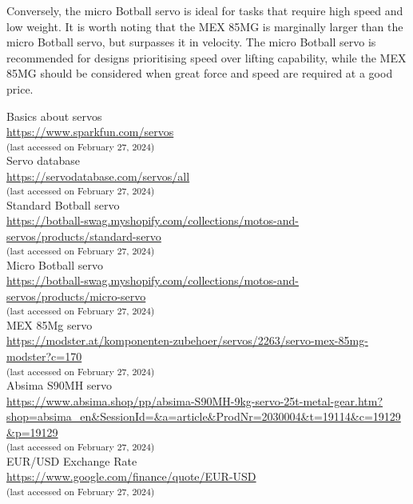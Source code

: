 \documentclass[conference]{IEEEtran}
\begin{document}
    Conversely, the micro Botball servo is ideal for tasks that require high speed and low weight. It is worth noting that the MEX 85MG is marginally larger than the micro Botball servo, but surpasses it in velocity.  The micro Botball servo is recommended for designs prioritising speed over lifting capability, while the MEX 85MG should be considered when great force and speed are required at a good price.

\begin{thebibliography}{00}
     Basics about servos\\
    \url{https://www.sparkfun.com/servos}\\
    \textsubscript{(last accessed on February 27, 2024)}\\
    
     Servo database\\
    \url{https://servodatabase.com/servos/all} \\
    \textsubscript{(last accessed on February 27, 2024)}\\
    
     Standard Botball servo\\
    \url{https://botball-swag.myshopify.com/collections/motos-and-servos/products/standard-servo} \\
    \textsubscript{(last accessed on February 27, 2024)}\\
    
     Micro Botball servo\\
    \url{https://botball-swag.myshopify.com/collections/motos-and-servos/products/micro-servo} \\
    \textsubscript{(last accessed on February 27, 2024)}\\
    
     MEX 85Mg servo\\
    \url{https://modster.at/komponenten-zubehoer/servos/2263/servo-mex-85mg-modster?c=170} \\
    \textsubscript{(last accessed on February 27, 2024)}\\
    
     Absima S90MH servo\\
    \url{https://www.absima.shop/pp/absima-S90MH-9kg-servo-25t-metal-gear.htm?shop=absima_en&SessionId=&a=article&ProdNr=2030004&t=19114&c=19129&p=19129} \\
    \textsubscript{(last accessed on February 27, 2024)}\\
    
     EUR/USD Exchange Rate\\
    \url{https://www.google.com/finance/quote/EUR-USD} \\
    \textsubscript{(last accessed on February 27, 2024)}\\
\end{thebibliography}
\end{document}
